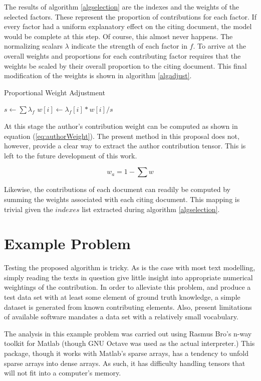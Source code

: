 \documentclass{article}
\begin{document}
The results of algorithm \ref{algselection} are the
indexes and the weights of the selected factors.  These represent the
proportion of contributions for each factor.  If every factor had
a uniform explanatory effect on the citing document, the model would
be complete at this step.  Of course, this almost never happens.  The
normalizing scalars $\lambda$ indicate the strength of each factor in
$f$.  To arrive at the overall weights and proportions for each
contributing factor requires that the weights be scaled by their
overall proportion to the citing document.  This final modification of
the weights is shown in algorithm \ref{algadjust}.

\begin{algorithm}
    \label{algadjust}
    \caption{Proportional Weight Adjustment}
    $s \leftarrow \sum \lambda_f$\;
     {
        $w[i] \leftarrow \lambda_f[i] * w[i] / s$\;
    }
\end{algorithm}

At this stage the author's contribution weight can be computed as
shown in equation (\ref{eq:authorWeight}).  The present method in this
proposal does not, however, provide a clear way to extract the author
contribution tensor.  This is left to the future development of this
work.

\begin{equation}
    \label{eq:authorWeight}
    w_a = 1 - \sum w
\end{equation}

Likewise, the contributions of each document can readily be computed
by summing the weights associated with each citing document.  This
mapping is trivial given the $indexes$ list extracted during algorithm
\ref{algselection}. 

\section{Example Problem}
Testing the proposed algorithm is tricky.  As is the case with most
text modelling, simply reading the texts in question give little
insight into appropriate numerical weightings of the contribution.  In
order to alleviate this problem, and produce a test data set with at
least some element of ground truth knowledge, a simple dataset is
generated from known contributing elements.  Also, present limitations
of available software mandates a data set with a relatively small
vocabulary.

The analysis in this example problem was carried out using Rasmus
Bro's n-way toolkit \cite{andersson2000} for Matlab (though GNU Octave was used as the
actual interpreter.)  This package, though it works with Matlab's
sparse arrays, has a tendency to unfold sparse arrays into dense
arrays.  As such, it has difficulty handling tensors that will not fit
into a computer's memory.  
\end{document}
